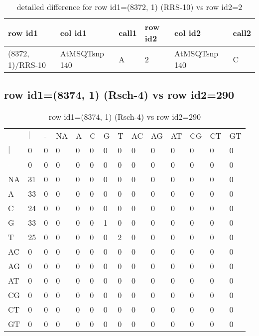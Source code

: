 \begin{center}
\begin{longtable}{|l|l|l|l|l|l|}
\caption{detailed difference for row id1=(8372, 1) (RRS-10) vs row id2=2} \label{table_dm415}\\
\hline
row id1&col id1&call1&row id2&col id2&call2\\
\hline
(8372, 1)/RRS-10&AtMSQTsnp 140&A&2&AtMSQTsnp 140&C\\
\hline
\end{longtable}
\end{center}

\subsection{row id1=(8374, 1) (Rsch-4) vs row id2=290}
\begin{center}
\begin{longtable}{|l|l|l|l|l|l|l|l|l|l|l|l|l|l|}
\caption{row id1=(8374, 1) (Rsch-4) vs row id2=290} \label{table_dm416}\\
\hline
\\
\hline
&$|$&-&NA&A&C&G&T&AC&AG&AT&CG&CT&GT\\
$|$&0&0&0&0&0&0&0&0&0&0&0&0&0\\
-&0&0&0&0&0&0&0&0&0&0&0&0&0\\
NA&31&0&0&0&0&0&0&0&0&0&0&0&0\\
A&33&0&0&0&0&0&0&0&0&0&0&0&0\\
C&24&0&0&0&0&0&0&0&0&0&0&0&0\\
G&33&0&0&0&0&1&0&0&0&0&0&0&0\\
T&25&0&0&0&0&0&2&0&0&0&0&0&0\\
AC&0&0&0&0&0&0&0&0&0&0&0&0&0\\
AG&0&0&0&0&0&0&0&0&0&0&0&0&0\\
AT&0&0&0&0&0&0&0&0&0&0&0&0&0\\
CG&0&0&0&0&0&0&0&0&0&0&0&0&0\\
CT&0&0&0&0&0&0&0&0&0&0&0&0&0\\
GT&0&0&0&0&0&0&0&0&0&0&0&0&0\\
\hline
\end{longtable}
\end{center}

